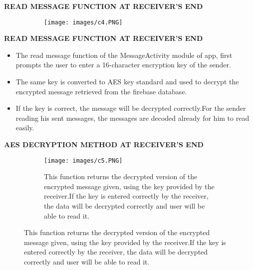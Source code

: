 \documentclass{beamer}
\begin{document}
\begin{frame}
\begin{tcolorbox}
\begin{center}
\textsc{\textbf{\textcolor{byzantium}{READ MESSAGE FUNCTION AT RECEIVER'S END}}}
\end{center}
\end{tcolorbox}
\begin{figure}
\centering
\begin{subfigure}{\textwidth}
  \centering
  \texttt{[image: images/c4.PNG]}
  \begin{flushleft}
  \end{flushleft}
  \label{fig:sub1}
\end{subfigure}
\end{figure}
\end{frame}

\begin{frame}
\begin{tcolorbox}
\begin{center}
\textsc{\textbf{\textcolor{byzantium}{READ MESSAGE FUNCTION AT RECEIVER'S END}}}
\end{center} 
\end{tcolorbox}
\begin{flushleft}
\begin{itemize}
\item The read message function of the MessageActivity module of app, first prompts the user to enter a 16-character encryption key of the sender.
\item The same key is converted to AES key standard and used to decrypt the encrypted message retrieved from the firebase database. 
\item If the key is correct, the message will be decrypted correctly.For the sender reading his sent messages, the messages are decoded already for him to read easily. 
\end{itemize}
\end{flushleft}
\end{frame}



\begin{frame}
\begin{tcolorbox}
\begin{center}
\textsc{\textbf{\textcolor{byzantium}{AES DECRYPTION METHOD AT RECEIVER'S END}}}
\end{center}
\end{tcolorbox}
\begin{figure}
\centering
\begin{subfigure}{\textwidth}
  \centering
    \begin{center}
  \caption{
This function returns the decrypted version of the encrypted message given, using the key provided by the receiver.If the key is entered correctly by the receiver, the data will be decrypted correctly and user will be able to read it.}
  \end{center}
  \texttt{[image: images/c5.PNG]}

  \label{fig:sub1}
\end{subfigure}
\end{figure}
\end{frame}
\end{document}

